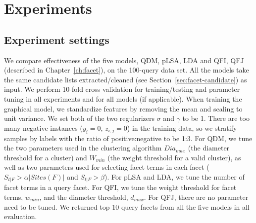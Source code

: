 \section{Experiments}
\label{sec:ie-exp}
\subsection{Experiment settings}
We compare effectiveness of the five models, QDM, pLSA, LDA and QFI, QFJ (described in Chapter~\ref{ch:facet}), on the 100-query data set.
All the models take the same candidate lists extracted/cleaned (see Section~\ref{sec:facet-candidate}) as input.
We perform 10-fold cross validation for training/testing and parameter tuning in all experiments and for all models (if applicable).
When training the graphical model, we standardize features by removing the mean and scaling to unit variance.
We set both of the two regularizers $\sigma$ and $\gamma$ to be 1.
There are too many negative instances ($y_i=0$, $z_{i,j}=0$) in the training data, so we stratify samples by labels with the ratio of positive:negative to be 1:3.
For QDM, we tune the two parameters used in the clustering algorithm $Dia_{max}$ (the diameter threshold for a cluster) and $W_{min}$ (the weight threshold for a valid cluster), as well as two parameters used for selecting facet terms in each facet ($S_{t|F} > \alpha |Sites(F)|$ and $S_{t|F}>\beta$).
For pLSA and LDA, we tune the number of facet terms in a query facet.
For QFI, we tune the weight threshold for facet terms, $w_{min}$, and the diameter threshold,  $d_{max}$.
For QFJ, there are no parameter need to be tuned.
We returned top 10 query facets from all the five models in all evaluation. 
